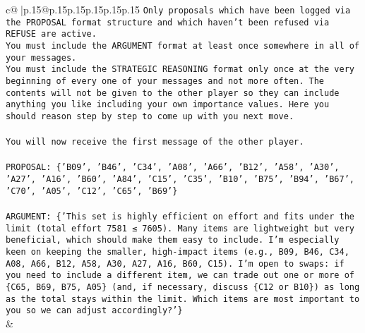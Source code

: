 \documentclass{article}
\begin{document}
{\begin{supertabular}{c@{$\;$}|p{.15\linewidth}@{}p{.15\linewidth}p{.15\linewidth}p{.15\linewidth}p{.15\linewidth}p{.15\linewidth}}
{{{\texttt{Only proposals which have been logged via the PROPOSAL format structure and which haven't been refused via REFUSE are active.} \\
\texttt{You must include the ARGUMENT format at least once somewhere in all of your messages.} \\
\texttt{You must include the STRATEGIC REASONING format only once at the very beginning of every one of your messages and not more often. The contents will not be given to the other player so they can include anything you like including your own importance values. Here you should reason step by step to come up with you next move.} \\
\\ 
\texttt{You will now receive the first message of the other player.} \\
\\ 
\texttt{PROPOSAL: \{'B09', 'B46', 'C34', 'A08', 'A66', 'B12', 'A58', 'A30', 'A27', 'A16', 'B60', 'A84', 'C15', 'C35', 'B10', 'B75', 'B94', 'B67', 'C70', 'A05', 'C12', 'C65', 'B69'\}} \\
\\ 
\texttt{ARGUMENT: \{'This set is highly efficient on effort and fits under the limit (total effort 7581 ≤ 7605). Many items are lightweight but very beneficial, which should make them easy to include. I’m especially keen on keeping the smaller, high{-}impact items (e.g., B09, B46, C34, A08, A66, B12, A58, A30, A27, A16, B60, C15). I’m open to swaps: if you need to include a different item, we can trade out one or more of \{C65, B69, B75, A05\} (and, if necessary, discuss \{C12 or B10\}) as long as the total stays within the limit. Which items are most important to you so we can adjust accordingly?'\}} \\
            }
        }
    }
    & \\ \\


\end{supertabular}}
\end{document}
